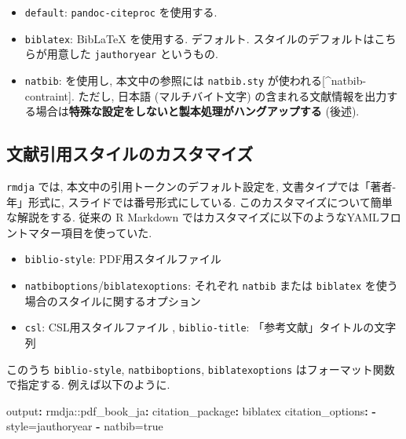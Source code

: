 \documentclass[
]{bxjsbook}
\newenvironment{Shaded}{\begin{snugshade}}{\end{snugshade}}
\newcommand{\AttributeTok}[1]{\textcolor[rgb]{0.77,0.63,0.00}{#1}}
\newcommand{\FunctionTok}[1]{\textcolor[rgb]{0.00,0.00,0.00}{#1}}
\newcommand{\KeywordTok}[1]{\textcolor[rgb]{0.13,0.29,0.53}{\textbf{#1}}}
\providecommand{\tightlist}{%
  \setlength{\itemsep}{0pt}\setlength{\parskip}{0pt}}
\theoremstyle{definition}
\theoremstyle{definition}
\theoremstyle{definition}
\theoremstyle{remark}
\begin{document}
\begin{itemize}
\tightlist
\item
  \texttt{default}: \texttt{pandoc-citeproc} を使用する.
\item
  \texttt{biblatex}: BibLaTeX を使用する. デフォルト.
  スタイルのデフォルトはこちらが用意した \texttt{jauthoryear}
  というもの.
\item
  \texttt{natbib}: \BibTeX を使用し, 本文中の参照には
  \texttt{natbib.sty} が使われる{[}\^{}natbib-contraint{]}. ただし,
  日本語 (マルチバイト文字)
  の含まれる文献情報を出力する場合は\textbf{特殊な設定をしないと製本処理がハングアップする}
  (後述).
\end{itemize}

\hypertarget{ux6587ux732eux5f15ux7528ux30b9ux30bfux30a4ux30ebux306eux30abux30b9ux30bfux30deux30a4ux30ba}{%
\subsection{文献引用スタイルのカスタマイズ}\label{ux6587ux732eux5f15ux7528ux30b9ux30bfux30a4ux30ebux306eux30abux30b9ux30bfux30deux30a4ux30ba}}

\texttt{rmdja} では, 本文中の引用トークンのデフォルト設定を,
文書タイプでは「著者-年」形式に, スライドでは番号形式にしている.
このカスタマイズについて簡単な解説をする. 従来の R Markdown
ではカスタマイズに以下のようなYAMLフロントマター項目を使っていた.

\begin{itemize}
\tightlist
\item
  \texttt{biblio-style}: PDF用スタイルファイル
\item
  \texttt{natbiboptions}/\texttt{biblatexoptions}: それぞれ
  \texttt{natbib} または \texttt{biblatex}
  を使う場合のスタイルに関するオプション
\item
  \texttt{csl}: CSL用スタイルファイル , \texttt{biblio-title}:
  「参考文献」タイトルの文字列
\end{itemize}

このうち \texttt{biblio-style}, \texttt{natbiboptions},
\texttt{biblatexoptions} はフォーマット関数で指定する.
例えば以下のように.

\begin{Shaded}
\begin{Highlighting}[]
\FunctionTok{output}\KeywordTok{:}
\AttributeTok{  rmdja:}\FunctionTok{:pdf\_book\_ja}\KeywordTok{:}
\AttributeTok{    }\FunctionTok{citation\_package}\KeywordTok{:}\AttributeTok{ biblatex}
\AttributeTok{    }\FunctionTok{citation\_options}\KeywordTok{:}
\AttributeTok{      }\KeywordTok{{-}}\AttributeTok{ style=jauthoryear}
\AttributeTok{      }\KeywordTok{{-}}\AttributeTok{ natbib=true}
\end{Highlighting}
\end{Shaded}
\end{document}
